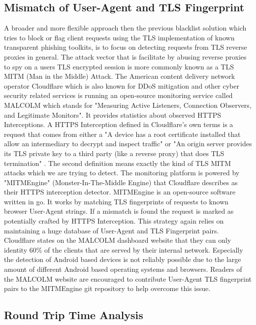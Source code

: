\documentclass[12pt]{report}
\begin{document}
\subsection{Mismatch of User-Agent and TLS Fingerprint}
A broader and more flexible approach then the previous blacklist solution which tries to block or flag client requests using the TLS implementation of known transparent phishing toolkits, is to focus on detecting requests from TLS reverse proxies in general. The attack vector that is facilitate by abusing reverse proxies to spy on a users TLS encrypted session is more commonly known as a TLS MITM (Man in the Middle) Attack. The American content delivery network operator Cloudflare which is also known for DDoS mitigation and other cyber security related services is running an open-source monitoring service called MALCOLM which stands for "Measuring Active Listeners, Connection Observers, and Legitimate Monitors". It provides statistics about observed HTTPS Interceptions. A HTTPS Interception defined in Cloudflare's own terms is a request that comes from either a "A device has a root certificate installed that allow an intermediary to decrypt and inspect traffic" or "An origin server provides its TLS private key to a third party (like a reverse proxy) that does TLS termination" \cite{cloudflareMALCOLM}. The second definition means exactly the kind of TLS MITM attacks which we are trying to detect. The monitoring platform is powered by "MITMEngine" (Monster-In-The-Middle Engine) that Cloudflare describes as their HTTPS interception detector. MITMEngine is an open-source software written in go. It works by matching TLS fingerprints of requests to known browser User-Agent strings. If a mismatch is found the request is marked as potentially crafted by HTTPS Interception. This strategy again relies on maintaining a huge database of User-Agent and TLS Fingerprint pairs. Cloudflare states on the MALCOLM dashboard website that they can only identity 60\% of the clients that are served by their internal network. Especially the detection of Android based devices is not reliably possible due to the large amount of different Android based operating systems and browsers. Readers of the MALCOLM website are encouraged to contribute User-Agent TLS fingerprint pairs to the MITMEngine git repository to help overcome this issue.

\newpage
\subsection{Round Trip Time Analysis}
\end{document}
